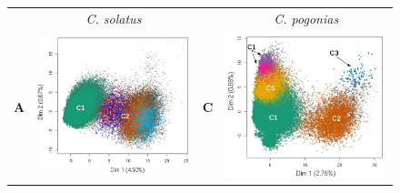 \documentclass[12pt,a4paper]{article}
\begin{document}
		\begin{figure}	
			\begin{tabular}{cc|cc}
				  & \textit{C. solatus} &  &  \textit{C. pogonias}\\
		\textbf{A} & \includegraphics[scale=0.35]{img/solatus_ACP1.png} & \textbf{C} & \includegraphics[scale=0.35]{img/pogonias_ACP1.png} \\

\end{tabular}
\end{figure}
\end{document}
